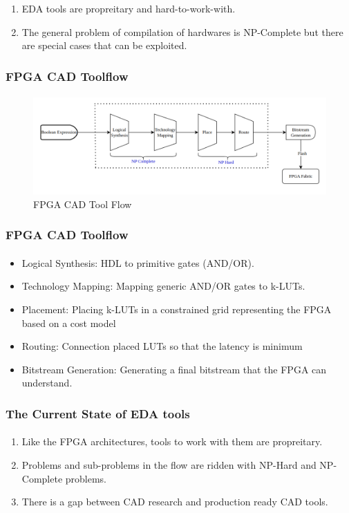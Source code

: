 \documentclass{beamer}
\begin{document}
{\begin{frame}[fragile]
\begin{enumerate}
    \item EDA tools are propreitary and hard-to-work-with.
    \item The general problem of compilation of hardwares is NP-Complete but
      there are special cases that can be exploited.
  \end{enumerate}
\end{frame}

\begin{frame}[fragile]
  \frametitle{FPGA CAD Toolflow}
  \framesubtitle{}
   \begin{figure}
        \centering
        \includegraphics[width=1\linewidth]{images/cad_flow.png}
        \caption{FPGA CAD Tool Flow}
        \label{exa_cadflow}
    \end{figure}
\end{frame}

\begin{frame}[fragile]
  \frametitle{FPGA CAD Toolflow}
  \framesubtitle{}
   \begin{itemize}
     \item Logical Synthesis: HDL to primitive gates (AND/OR).
     \item Technology Mapping: Mapping generic AND/OR gates to k-LUTs.
     \item Placement: Placing k-LUTs in a constrained grid representing the FPGA
       based on a cost model
     \item Routing: Connection placed LUTs so that the latency is minimum
     \item Bitstream Generation: Generating a final bitstream that the FPGA
       can understand.
    \end{itemize}
\end{frame}

\begin{frame}[fragile]
  \frametitle{The Current State of EDA tools}
  \framesubtitle{}
  \begin{enumerate}
    \item Like the FPGA architectures, tools to work with them are propreitary.
    \item Problems and sub-problems in the flow are ridden with NP-Hard and
      NP-Complete problems.
    \item There is a gap between CAD research and production ready CAD tools.
  \end{enumerate}
\end{frame}

}
\end{document}
